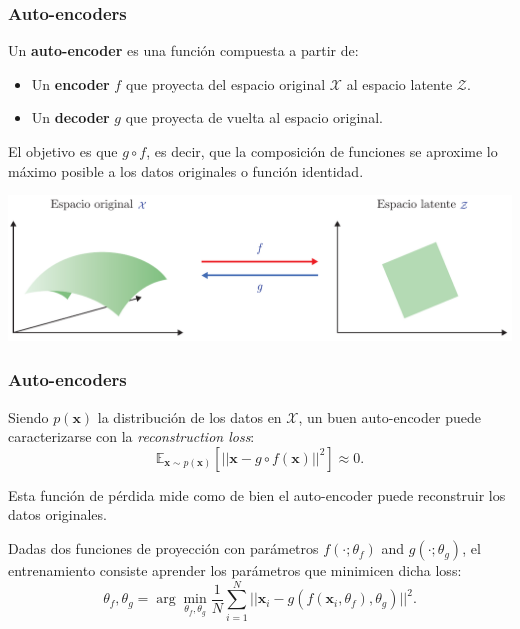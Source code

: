 \documentclass[aspectratio=169]{beamer}
\begin{document}

\begin{frame}[t]
  \frametitle{Auto-encoders}
  Un \textbf{auto-encoder} es una función compuesta a partir de:
  \begin{itemize}
    \item Un \textbf{encoder} $f$ que proyecta del espacio original $\mathcal{X}$ al espacio latente $\mathcal{Z}$.
    \item Un \textbf{decoder} $g$ que proyecta de vuelta al espacio original.
  \end{itemize} 

  \begin{block}{}
    El objetivo es que $g \circ f$, es decir, que la composición de funciones se aproxime lo máximo posible a los datos originales o función identidad.
  \end{block}
  \vspace{.3cm}
  \includegraphics[width=.78\textwidth, center]{imgs/tema4/aenc/aenc_3.pdf}\\

\end{frame}


\begin{frame}[t]\frametitle{Auto-encoders}
  Siendo $p(\mathbf{x})$ la distribución de los datos en $\mathcal{X}$, un buen auto-encoder puede caracterizarse con la \emph{reconstruction loss}:
  $$\mathbb{E}_{\mathbf{x} \sim p(\mathbf{x})} \left[ || \mathbf{x} - g \circ f(\mathbf{x}) ||^2 \right] \approx 0.$$

  \begin{block}{}
    Esta función de pérdida mide como de bien el auto-encoder puede reconstruir los datos originales.
  \end{block}

  Dadas dos funciones de proyección con parámetros $f(\cdot; \theta_f)$ and $g(\cdot;\theta_g)$, el entrenamiento consiste aprender los parámetros que minimicen dicha loss:
  $$\theta_f, \theta_g = \arg \min_{\theta_f, \theta_g} \frac{1}{N} \sum_{i=1}^N || \mathbf{x}_i - g(f(\mathbf{x}_i,\theta_f), \theta_g) ||^2.$$

\end{frame}
\end{document}
